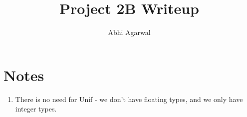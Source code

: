 \documentclass[11pt, oneside]{article}
\title{Project 2B Writeup}
\author{Abhi Agarwal}
\date{}
\begin{document}
\maketitle
\section{Notes}
\begin{enumerate}
\item There is no need for Unif - we don't have floating types, and we only have integer types. 

\end{enumerate}
\end{document}
